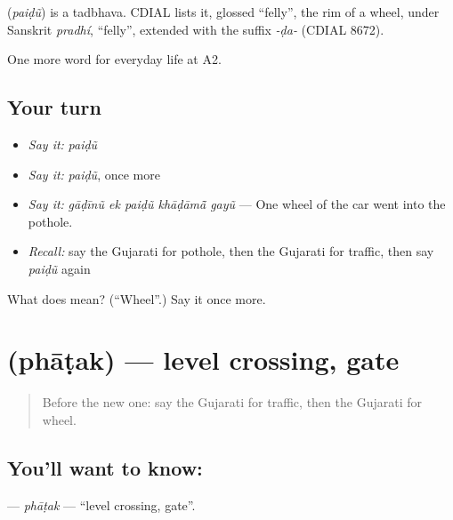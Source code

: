 \begin{cousinweb}
\textbf{} (\emph{paiḍũ}) is a tadbhava. CDIAL lists it, glossed \textquotedblleft{}felly\textquotedblright{}, the rim of a wheel, under Sanskrit \emph{pradhí}, \textquotedblleft{}felly\textquotedblright{}, extended with the suffix \emph{-ḍa-} (CDIAL 8672).
\end{cousinweb}

\begin{grammarlens}[title={What you've built}]
One more word for everyday life at A2.
\end{grammarlens}

\subsection*{Your turn}
\begin{itemize}
\raggedright
  \item \emph{Say it:} \emph{paiḍũ}
  \item \emph{Say it:} \emph{paiḍũ}, once more
  \item \emph{Say it:} \emph{gāḍīnũ ek paiḍũ khāḍāmā̃ gayũ} — One wheel of the car went into the pothole.
  \item \emph{Recall:} say the Gujarati for pothole, then the Gujarati for traffic, then say \emph{paiḍũ} again
\end{itemize}

\begin{tcolorbox}[breakable,colback=teal!4,colframe=teal!35!black,title={Before you move on}]
What does  mean? (\textquotedblleft{}Wheel\textquotedblright{}.) Say it once more.
\end{tcolorbox}
\section[\texorpdfstring{\gu{ફાટક} (phāṭak)}{ફાટક (phāṭak)}]{ (phāṭak) — level crossing, gate}

\label{lesson:GU-C208-phatak}



\begin{quote}
Before the new one: say the Gujarati for traffic, then the Gujarati for wheel.
\end{quote}

\subsection*{You'll want to know: }
\textbf{} — \emph{phāṭak} — \textquotedblleft{}level crossing, gate\textquotedblright{}.

